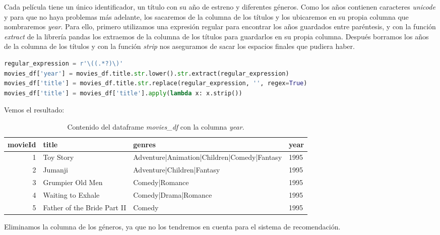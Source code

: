 \documentclass{uimppracticas}
\begin{document}
Cada película tiene un único identificador, un título con su año de estreno y diferentes géneros. Como los años contienen caracteres \textit{unicode} y para que no haya problemas más adelante, los sacaremos de la columna de los títulos y los ubicaremos en su propia columna que nombraremos \textit{year}. Para ello, primero utilizamos una expresión regular para encontrar los años guardados entre paréntesis, y con la función \textit{extract} de la librería pandas los extraemos de la columna de los títulos para guardarlos en su propia columna. Después borramos los años de la columna de los títulos y con la función \textit{strip} nos aseguramos de sacar los espacios finales que pudiera haber.

\begin{lstlisting}[language=python]
regular_expression = r'\((.*?)\)'
movies_df['year'] = movies_df.title.str.lower().str.extract(regular_expression)
movies_df['title'] = movies_df.title.str.replace(regular_expression, '', regex=True)
movies_df['title'] = movies_df['title'].apply(lambda x: x.strip())
\end{lstlisting}

Vemos el resultado:

\begin{table}[h]
	\centering
	\begin{tabular}{rlll}
		\toprule
		movieId &                        title &                                       genres &  year \\
		\midrule
		1 &                    Toy Story &  Adventure|Animation|Children|Comedy|Fantasy &  1995 \\
		2 &                      Jumanji &                   Adventure|Children|Fantasy &  1995 \\
		3 &             Grumpier Old Men &                               Comedy|Romance &  1995 \\
		4 &            Waiting to Exhale &                         Comedy|Drama|Romance &  1995 \\
		5 &  Father of the Bride Part II &                                       Comedy &  1995 \\
		\bottomrule
	\end{tabular}
	\caption{Contenido del dataframe \textit{movies\_df} con la columna \textit{year}.}
	\label{movies_df_years}
\end{table}

Eliminamos la columna de los géneros, ya que no los tendremos en cuenta para el sistema de recomendación.
\end{document}
